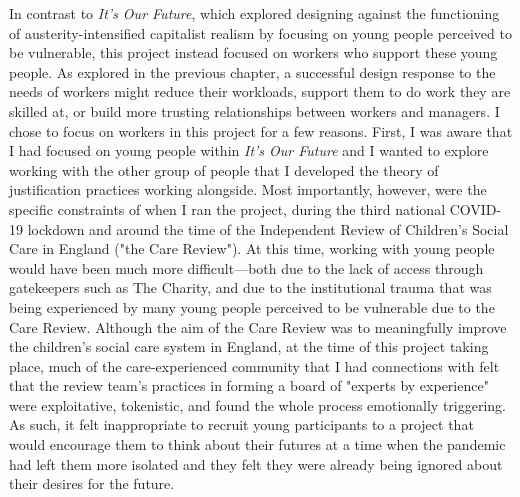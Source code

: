 In contrast to \textit{It's Our Future}, which explored designing against the functioning of austerity-intensified capitalist realism by focusing on young people perceived to be vulnerable, this project instead focused on workers who support these young people. As explored in the previous chapter, a successful design response to the needs of workers might reduce their workloads, support them to do work they are skilled at, or build more trusting relationships between workers and managers. I chose to focus on workers in this project for a few reasons. First, I was aware that I had focused on young people within \textit{It's Our Future} and I wanted to explore working with the other group of people that I developed the theory of justification practices working alongside. Most importantly, however, were the specific constraints of when I ran the project, during the third national COVID-19 lockdown and around the time of the Independent Review of Children's Social Care in England ("the Care Review"). At this time, working with young people would have been much more difficult—both due to the lack of access through gatekeepers such as The Charity, and due to the institutional trauma that was being experienced by many young people perceived to be vulnerable due to the Care Review. Although the aim of the Care Review was to meaningfully improve the children's social care system in England, at the time of this project taking place, much of the care-experienced community that I had connections with felt that the review team's practices in forming a board of "experts by experience" were exploitative, tokenistic, and found the whole process emotionally triggering. As such, it felt inappropriate to recruit young participants to a project that would encourage them to think about their futures at a time when the pandemic had left them more isolated and they felt they were already being ignored about their desires for the future. 

